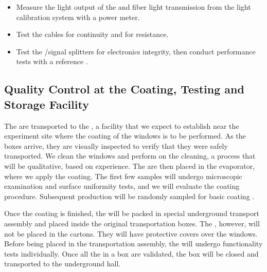 \begin{itemize}
\item Measure the light output of the  and fiber light transmission from the light calibration system %
with a power meter.

\item Test the  cables %
for continuity and for resistance.

\item Test the /signal splitters %
for electronics integrity, then conduct %
performance tests with a reference .

\end{itemize}

\subsection{Quality Control at the Coating, Testing and Storage Facility}

The  are transported to the , a facility that we expect to establish %
near the experiment site where the  coating of the  windows is to be  performed. As the  boxes arrive, %
they are visually inspected to verify that they were safely transported. %
We clean the  windows %
and perform  on the cleaning, a process that will be qualitative, based on experience. The  are then placed in the evaporator, where we apply the coating. The first few samples will undergo microscopic examination and surface uniformity tests, and we will evaluate the coating procedure. Subsequent production  will be randomly sampled for basic coating .

Once the coating is finished, the  will be packed in special underground transport assembly and placed inside the original transportation boxes. The , however, will not be placed in the cartons. They will have protective covers over the windows. Before being placed in the transportation assembly, the  will undergo functionality tests individually. Once all the  in a box are validated, the box will be closed and transported to the underground hall. 

